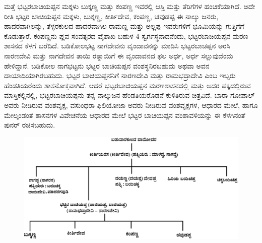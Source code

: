ಮತ್ತೆ ಭಟ್ಟರಬಾಚಿಯಪ್ಪನ ಮಕ್ಕಳು ಬುಕ್ಕಣ್ಣ ಮತ್ತು ಕಂಪಣ್ಣ ಇವರಲ್ಲಿ ಆಸ್ತಿ ಮತ್ತು ತೆರಿಗೆಗಳ ಹಂಚಿಕೆಯಾಗಿದೆ. ಅದೇ ರೀತಿ ಭಟ್ಟರ ಬಾಚಿಯಪ್ಪನ ಮಕ್ಕಳು, ಬುಕ್ಕಣ್ಣ, ಕೀರ್ತಿದೇವ, ಕಂಪಣ್ಣ, ಚವುಡಪ್ಪ ಈ ನಾಲ್ಕು ಜನರು, ಹಾದರವಾಗಿಲನ್ನು, ತೆಳ್ಳರಕುಲದ ಹಾದರವಾಗಿಲ ರಾಮಣ್ಣ ಮತ್ತು ಅಲ್ಲಪ್ಪ ಇವರುಗಳಿಗೆ ಭೂಮಿಯನ್ನು ಗುತ್ತಿಗೆಗೆ ಕೊಡುತ್ತಾರೆ. ಕಂಪಣ್ಣನು ಪ್ಲವ ಸಂವತ್ಸರದ ವೈಶಾಖ ಬಹುಳ 4 ಸ್ವರ್ಗಸ್ಥನಾದನೆಂದು, ಭಟ್ಟರಬಾಚಿಯಪ್ಪನ ಮರಣ ಶಾಸನದ ಕೆಳಗೆ ಬರೆದಿದೆ. ಬಡಿಕೋಲಭಟ್ಟ ನಾಗದೇವನು ವೃಂದಾವನನ್ನು ಮಾಡಿಸಿ ಭಟ್ಟರಬಾಚಪ್ಪನ ಅರಸಿ ನಾರಣದೇವಿ ಮತ್ತು ನಾಗದೇವನ ತಾಯಿ ರತ್ನಾಯಿಗೆ ಈ ವೃಂದಾವನದ ಫಲ ಅರ್ಧ, ಅರ್ಧ ಸಲ್ಲುವುದೆಂದು ಹೇಳಿದ್ದಾನೆ. ಬಡಿಕೋಲ ನಾಗಭಟ್ಟನು ಭಟ್ಟರ ಬಾಚಿಯಪ್ಪನ ವಂಶಸ್ಥನಿರಬಹುದು ಅಥವಾ ಅವನ ದಾಯಾದಿಯಾಗಿರಬಹುದು. ಭಟ್ಟರ ಬಾಚಿಯಪ್ಪನನಿಗೆ ನಾರಣದೇವಿ ಮತ್ತು ರಾಮಭದ್ರಾದೇವಿ ಎಂಬ ಇಬ್ಬರು ಹೆಂಡತಿಯರೆಂದು ಶಾಸನೋಕ್ತವಾಗಿದೆ. ಆದರೆ ಭಟ್ಟರಬಾಚಿಯಪ್ಪನ ಮರಣಶಾಸನದಲ್ಲಿ ಮತ್ತು ಅದರ ಪಕ್ಕದಲ್ಲಿರುವ ಮಾಸ್ತಿಕಲ್ಲಿನಲ್ಲಿ, ಭಟ್ಟರಬಾಚಿಯಪ್ಪನು ತನ್ನ ನಾಲ್ಕುಜನ ಹೆಂಡತಿಯರೊಡನೆ ಕುಳಿತಿರುವ ಚಿತ್ರವಿದೆ. ಬಾರಾ ಗೋಪಾಲ್​ ಅವರು ನೀಡಿರುವ ವಂಶವೃಕ್ಷ, ವಸುಂಧರಾ ಫಿಲಿಯೋಜಾ ಅವರು ನೀಡಿರುವ ವಂಶವೃಕ್ಷಗಳ, ಆಧಾರದ ಮೇಲೆ, ಹಾಗೂ ಮೇಲ್ಕಂಡಂತೆ ಶಾಸನಗಳ ವಿವೇಚನೆಯ ಆಧಾರದ ಮೇಲೆ ಭಟ್ಟರ ಬಾಚಿಯಪ್ಪನ ವಂಶಾವಳಿಯನ್ನು ಈ ಕೆಳಗಿನಂತೆ ಪುನರ್ ರಚಿಸಬಹುದು.

\begin{figure}[H]
\includegraphics[scale=1.17]{images/chap3/chap3fig37.jpeg}
\end{figure}

